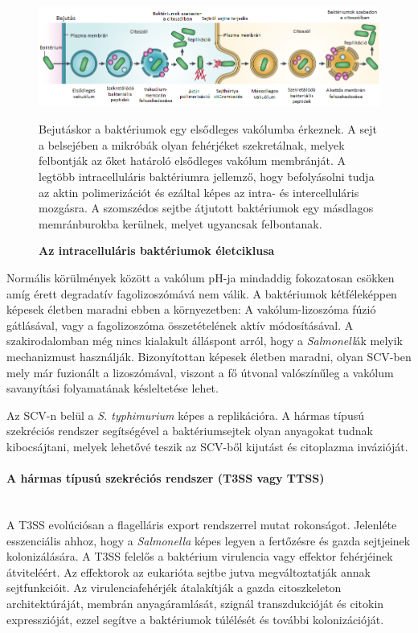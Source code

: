 \documentclass[a4paper,12pt]{article}
\newenvironment{imgdesc}{
		\small
		\singlespacing
		\begin{center}
		
	}{
		\end{center}	
	}
\begin{document}
		 \begin{figure}[H]
			 \centering
			 \includegraphics[scale=0.7]{img/intracell_bakt_terj_am.png}
			 \caption{\textbf{Az intracelluláris baktériumok életciklusa}}
			 \begin{imgdesc}
				 Bejutáskor a baktériumok egy elsődleges vakólumba érkeznek. A sejt a belsejében a mikróbák olyan fehérjéket szekretálnak, melyek felbontják az őket határoló elsődleges vakólum membránját. A legtöbb intracelluláris baktériumra jellemző, hogy befolyásolni tudja az aktin polimerizációt és ezáltal képes az intra- és intercelluláris mozgásra. A szomszédos sejtbe átjutott baktériumok egy másdlagos memránburokba kerülnek, melyet ugyancsak felbontanak.
			 \end{imgdesc}
			 \label{fig:salmo_cycle}
		 \end{figure}
		
		 Normális körülmények között a vakólum pH-ja mindaddig fokozatosan csökken amíg érett degradatív fagolizoszómává nem válik. A baktériumok kétféleképpen képesek életben maradni ebben a környezetben: A vakólum-lizoszóma fúzió gátlásával, vagy a fagolizoszóma összetételének aktív módosításával. \cite{salmonella_autophagy_nature_old} A szakirodalomban még nincs kialakult álláspont arról, hogy a \textit{Salmonell}ák melyik mechanizmust használják. Bizonyítottan képesek életben maradni, olyan SCV-ben mely már fuzionált a lizoszómával, viszont a fő útvonal valószínűleg a vakólum savanyítási folyamatának késleltetése lehet. \cite{salmonella_and_host_cell_nature} 
		 
		 Az SCV-n belül a \textit{S. typhimurium} képes a replikációra. A hármas típusú szekréciós rendszer segítségével a baktériumsejtek olyan anyagokat tudnak kibocsájtani, melyek lehetővé teszik az SCV-ből kijutást és citoplazma invázióját. \cite{salmonella_authopagy_intro}
		 
		 \paragraph{A hármas típusú szekréciós rendszer (T3SS vagy TTSS)} \mbox{}\\
		 A T3SS evolúciósan a flagelláris export rendszerrel mutat rokonságot. Jelenléte esszenciális ahhoz, hogy a \textit{Salmonella} képes legyen a fertőzésre és gazda sejtjeinek kolonizálására. A T3SS felelős a baktérium virulencia vagy effektor fehérjéinek átviteléért. Az effektorok az eukarióta sejtbe jutva megváltoztatják annak sejtfunkcióit. Az virulenciafehérjék átalakítják a gazda citoszkeleton architektúráját, membrán anyagáramlását, szignál transzdukcióját és citokin expresszióját, ezzel segítve a baktériumok túlélését és további kolonizációját. \cite{salmonella_and_host_cell_nature}
		 
\end{document}
